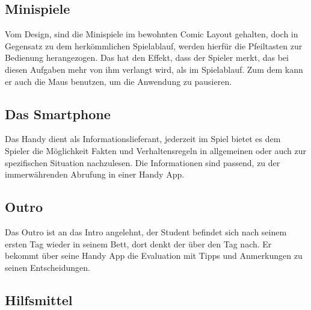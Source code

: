 \documentclass[a4paper, 11pt]{article} %
\begin{document}
\subsection{Minispiele}
Vom Design, sind die Minispiele im bewohnten Comic Layout gehalten, doch in Gegensatz zu dem herkömmlichen Spielablauf, werden hierfür die Pfeiltasten zur Bedienung herangezogen. Das hat den Effekt, dass der Spieler merkt, das bei diesen Aufgaben mehr von ihm verlangt wird, als im Spielablauf. Zum dem kann er auch die Maus benutzen, um die Anwendung zu pausieren.

\subsection{Das Smartphone}
Das Handy dient als Informationslieferant, jederzeit im Spiel bietet es dem Spieler die Möglichkeit Fakten und Verhaltensregeln in allgemeinen oder auch zur spezifischen Situation nachzulesen.
Die Informationen sind passend, zu der immerwährenden Abrufung in einer Handy App.

\subsection{Outro}
Das Outro ist an das Intro angelehnt, der Student befindet sich nach seinem ersten Tag wieder in seinem Bett, dort denkt der über den Tag nach. Er bekommt über seine Handy App die Evaluation mit Tipps und Anmerkungen zu seinen Entscheidungen. 

\subsection{Hilfsmittel}
\end{document}
